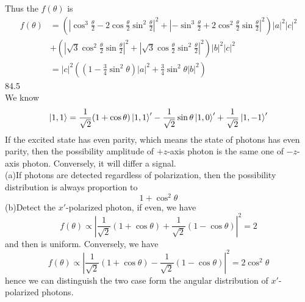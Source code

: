 \documentclass[utf8]{ctexart}
\begin{document}
Thus the $f(\theta)$ is
\begin{align*}
	f(\theta)&=(|\cos^3\frac{\theta}{2}-2\cos\frac{\theta}{2}\sin^2\frac{\theta}{2}|^2+|-\sin^3\frac{\theta}{2}+2\cos^2\frac{\theta}{2}\sin\frac{\theta}{2}|^2)|a|^2|c|^2\\
	&+(|\sqrt{3}\cos^2\frac{\theta}{2}\sin\frac{\theta}{2}|^2+|\sqrt{3}\cos\frac{\theta}{2}\sin^2\frac{\theta}{2}|^2)|b|^2|c|^2\\
	&=|c|^2((1-\frac{3}{4}\sin^2\theta)|a|^2+\frac{3}{4}\sin^2\theta|b|^2)
\end{align*}
84.5\\
We know
\[\ket{1,1}=\frac{1}{\sqrt{2}}(1+\cos\theta)\ket{1,1}'-\frac{1}{\sqrt{2}}\sin\theta\ket{1,0}'+\frac{1}{\sqrt{2}}\ket{1,-1}'\]
If the excited state has even parity, which means the state of photons has even parity, then the possibility amplitude of $+z$-axis photon is the same one of $-z$-axis photon. Conversely, it will differ a signal.\\
(a)If photons are detected regardless of polarization, then the possibility distribution is always proportion to
\[1+\cos^2\theta\]
(b)Detect the $x'$-polarized photon, if even, we have
\[f(\theta)\propto|\frac{1}{\sqrt{2}}(1+\cos\theta)+\frac{1}{\sqrt{2}}(1-\cos\theta)|^2=2\]
and then is uniform. Conversely, we have
\[f(\theta)\propto|\frac{1}{\sqrt{2}}(1+\cos\theta)-\frac{1}{\sqrt{2}}(1-\cos\theta)|^2=2\cos^2\theta\]
hence we can distinguish the two case form the angular distribution of $x'$-polarized photons. 
\end{document}
